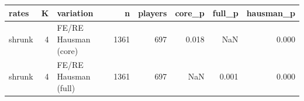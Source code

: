\begin{tabular}{lrlrrrrr}
\toprule
rates & K & variation & n & players & core\_p & full\_p & hausman\_p \\
\midrule
shrunk & 4 & FE/RE Hausman (core) & 1361 & 697 & 0.018 & NaN & 0.000 \\
shrunk & 4 & FE/RE Hausman (full) & 1361 & 697 & NaN & 0.001 & 0.000 \\
\bottomrule
\end{tabular}
